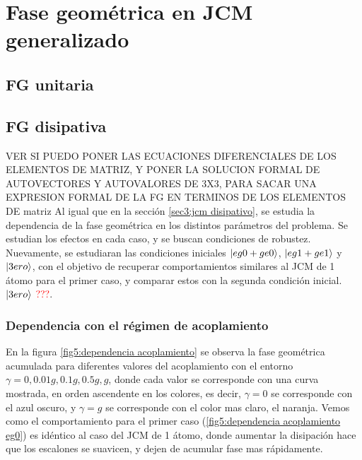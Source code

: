 \chapter{Fase geométrica en JCM generalizado}
\label{ch5:fgdoble}

\pagestyle{fancy}
\fancyhf{}
\fancyhead[LE]{\nouppercase{\rightmark\hfill}}
\fancyhead[RO]{\nouppercase{\leftmark\hfill}}
\fancyfoot[LE,RO]{\hfill\thepage\hfill}

\section{FG unitaria}

\section{FG disipativa}
VER SI PUEDO PONER LAS ECUACIONES DIFERENCIALES DE LOS ELEMENTOS DE MATRIZ, Y PONER LA SOLUCION FORMAL DE AUTOVECTORES Y AUTOVALORES DE 3X3, PARA SACAR UNA EXPRESION FORMAL DE LA FG EN TERMINOS DE LOS ELEMENTOS DE matriz
Al igual que en la sección \ref{sec3:jcm disipativo}, se estudia la dependencia de la fase geométrica en los distintos parámetros del problema. Se estudian los efectos en cada caso, y se buscan condiciones de robustez. Nuevamente, se estudiaran las condiciones iniciales $\ket{eg0+ge0}$, $\ket{eg1+ge1}$ y $\ket{3ero}$, con el objetivo de recuperar comportamientos similares al JCM de 1 átomo para el primer caso, y comparar estos con la segunda condición inicial. \textcolor{red}{$\ket{3ero}$ ???}.
\subsection{Dependencia con el régimen de acoplamiento}
En la figura \ref{fig5:dependencia acoplamiento} se observa la fase geométrica acumulada para diferentes valores del acoplamiento con el entorno $\gamma=0, 0.01g,0.1g,0.5g,g$, donde cada valor se corresponde con una curva mostrada, en orden ascendente en los colores, es decir, $\gamma=0$ se corresponde con el azul oscuro, y $\gamma=g$ se corresponde con el color mas claro, el naranja. Vemos como el comportamiento para el primer caso (\ref{fig5:dependencia acoplamiento eg0}) es idéntico al caso del JCM de 1 átomo, donde aumentar la disipación hace que los escalones se suavicen, y dejen de acumular fase mas rápidamente. 

